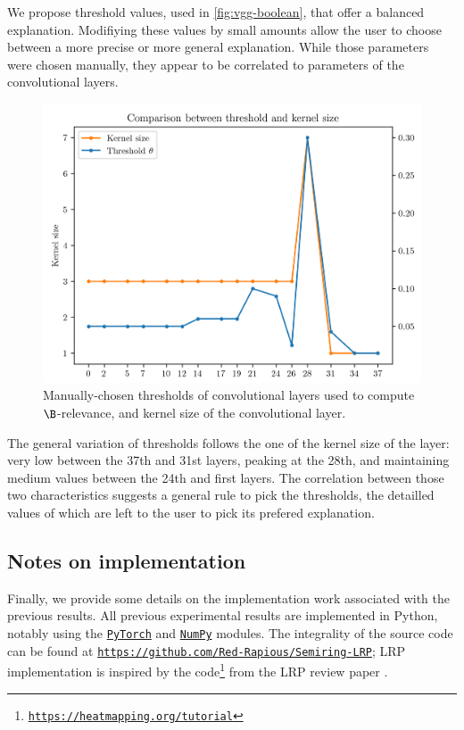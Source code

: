 \documentclass[twocolumn]{../cs-classes/cs-classes}
\newcommand*{\1}{\digitsbb{1}}
\newcommand*{\0}{\digitsbb{0}}
\begin{document}
We propose threshold values, used in \autoref{fig:vgg-boolean}, that offer a balanced explanation. Modifiying these values by small amounts allow the user to choose between a more precise or more general explanation.
While those parameters were chosen manually, they appear to be correlated to parameters of the convolutional layers. 
\begin{figure}[H]
    \centering
    \includegraphics[width=\linewidth]{threshold-kernel-comparison.png}
    \caption{Manually-chosen thresholds of convolutional layers used to compute $\B$-relevance, and kernel size of the convolutional layer.}
\end{figure}
The general variation of thresholds follows the one of the kernel size of the layer: very low between the 37th and 31st layers, peaking at the 28th, and maintaining medium values between the 24th and first layers. The correlation between those two characteristics suggests a general rule to pick the thresholds, the detailled values of which are left to the user to pick its prefered explanation.

\subsection{Notes on implementation}
\label{sec:implementation}
Finally, we provide some details on the implementation work associated with the previous results. All previous experimental results are implemented in Python, notably using the \href{https://pytorch.org}{\texttt{PyTorch}} and \href{https://numpy.org}{\texttt{NumPy}} modules. The integrality of the source code can be found at \href{https://github.com/Red-Rapious/Semiring-LRP}{\texttt{https://github.com/Red-Rapious/Semiring-LRP}}; LRP implementation is inspired by the code\footnote{\href{https://heatmapping.org/tutorial}{\texttt{https://heatmapping.org/tutorial}}} from the LRP review paper \cite{montavon-lrp}.
\end{document}
